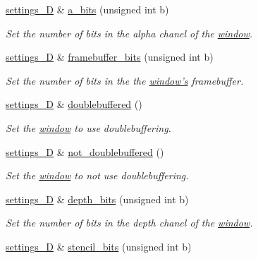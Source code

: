 \begin{DoxyCompactItemize}
\hyperlink{classgfx_1_1window_1_1settings__3D}{settings\-\_\-D} \& \hyperlink{classgfx_1_1window_1_1settings__3D_a411393fca26bf6acbe60019e7472ace1}{a\-\_\-bits} (unsigned int b)
\begin{DoxyCompactList}\small\item\em Set the number of bits in the alpha chanel of the \hyperlink{classgfx_1_1window}{window}. \end{DoxyCompactList}\item 
\hyperlink{classgfx_1_1window_1_1settings__3D}{settings\-\_\-D} \& \hyperlink{classgfx_1_1window_1_1settings__3D_a993d9801b5cd6d911cab12c42093f103}{framebuffer\-\_\-bits} (unsigned int b)
\begin{DoxyCompactList}\small\item\em Set the number of bits in the the \hyperlink{classgfx_1_1window}{window's} framebuffer. \end{DoxyCompactList}\item 
\hyperlink{classgfx_1_1window_1_1settings__3D}{settings\-\_\-D} \& \hyperlink{classgfx_1_1window_1_1settings__3D_ab48d4932118b82d2aa26c4e4f59ef783}{doublebuffered} ()
\begin{DoxyCompactList}\small\item\em Set the \hyperlink{classgfx_1_1window}{window} to use doublebuffering. \end{DoxyCompactList}\item 
\hyperlink{classgfx_1_1window_1_1settings__3D}{settings\-\_\-D} \& \hyperlink{classgfx_1_1window_1_1settings__3D_af8bdfcbfcd3e71809fdd4ddf421fab86}{not\-\_\-doublebuffered} ()
\begin{DoxyCompactList}\small\item\em Set the \hyperlink{classgfx_1_1window}{window} to not use doublebuffering. \end{DoxyCompactList}\item 
\hyperlink{classgfx_1_1window_1_1settings__3D}{settings\-\_\-D} \& \hyperlink{classgfx_1_1window_1_1settings__3D_addb691d46b8646d34962f1f8b06c2084}{depth\-\_\-bits} (unsigned int b)
\begin{DoxyCompactList}\small\item\em Set the number of bits in the depth chanel of the \hyperlink{classgfx_1_1window}{window}. \end{DoxyCompactList}\item 
\hyperlink{classgfx_1_1window_1_1settings__3D}{settings\-\_\-D} \& \hyperlink{classgfx_1_1window_1_1settings__3D_a89395e30b56b4722122a21384905c464}{stencil\-\_\-bits} (unsigned int b)

\end{DoxyCompactItemize}
